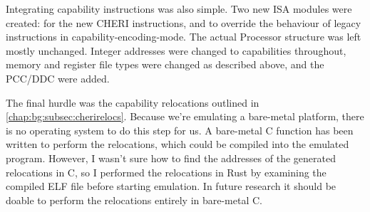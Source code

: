 
Integrating capability instructions was also simple.
Two new ISA modules were created:  for the new CHERI instructions, and  to override the behaviour of legacy instructions in capability-encoding-mode.
The actual Processor structure was left mostly unchanged.
Integer addresses were changed to capabilities throughout,
memory and register file types were changed as described above, and the PCC/DDC were added.

The final hurdle was the capability relocations outlined in \cref{chap:bg:subsec:cherirelocs}.
Because we're emulating a bare-metal platform, there is no operating system to do this step for us.
A bare-metal C function has been written to perform the relocations, which could be compiled into the emulated program.
However, I wasn't sure how to find the addresses of the generated relocations in C, so I performed the relocations in Rust by examining the compiled ELF file before starting emulation.
In future research it should be doable to perform the relocations entirely in bare-metal C.

